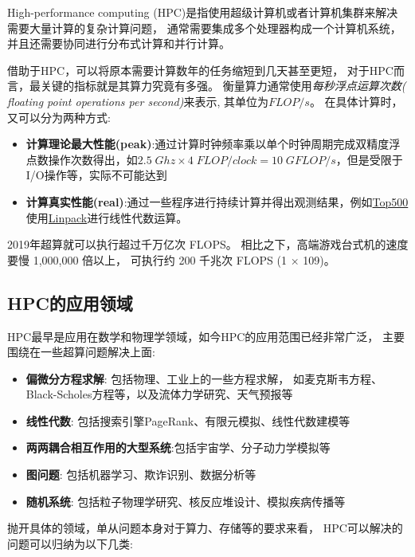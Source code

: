 High-performance computing (HPC)是指使用超级计算机或者计算机集群来解决需要大量计算的复杂计算问题，
通常需要集成多个处理器构成一个计算机系统，并且还需要协同进行分布式计算和并行计算。\cite{wiki_hpc}

借助于HPC，可以将原本需要计算数年的任务缩短到几天甚至更短，
对于HPC而言，最关键的指标就是其算力究竟有多强。
衡量算力通常使用\textit{每秒浮点运算次数( floating point operations per second)}\cite{wiki_flops}来表示,
其单位为$FLOP/s$。
在具体计算时，又可以分为两种方式:
\begin{itemize}
    \item \textbf{计算理论最大性能(peak)}:通过计算时钟频率乘以单个时钟周期完成双精度浮点数操作次数得出，如$2.5\;Ghz \times 4\;FLOP/clock = 10 \;GFLOP/s$，但是受限于I/O操作等，实际不可能达到
    \item \textbf{计算真实性能(real)}:通过一些程序进行持续计算并得出观测结果，例如\href{https://www.top500.org/}{Top500}使用\href{https://netlib.org/linpack/}{Linpack}进行线性代数运算。
\end{itemize}

2019年超算就可以执行超过千万亿次 FLOPS。
相比之下，高端游戏台式机的速度要慢 1,000,000 倍以上，
可执行约 200 千兆次 FLOPS (1 × 109)\cite{amd_hpc}。

\subsection{HPC的应用领域}
HPC最早是应用在数学和物理学领域，如今HPC的应用范围已经非常广泛，
主要围绕在一些超算问题解决上面\cite{hpc_book}:

\begin{itemize}
    \item \textbf{偏微分方程求解}: 包括物理、工业上的一些方程求解，
    如麦克斯韦方程、Black-Scholes方程等，以及流体力学研究、天气预报等
    \item \textbf{线性代数}: 包括搜索引擎PageRank、有限元模拟、线性代数建模等
    \item \textbf{两两耦合相互作用的大型系统}:包括宇宙学、分子动力学模拟等
    \item \textbf{图问题}: 包括机器学习、欺诈识别、数据分析等
    \item \textbf{随机系统}: 包括粒子物理学研究、核反应堆设计、模拟疾病传播等
\end{itemize}

抛开具体的领域，单从问题本身对于算力、存储等的要求来看，
HPC可以解决的问题可以归纳为以下几类\cite{hpc_problem_types}:


